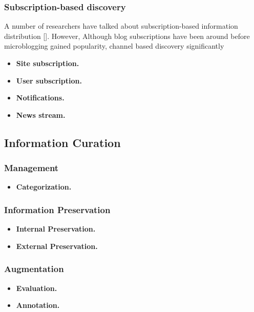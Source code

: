 \documentclass{casconpaper}
\begin{document}
{\subsubsection{Subscription-based discovery}
A number of researchers have talked about subscription-based information distribution []. However,  Although blog subscriptions have been around before microblogging gained popularity, channel based discovery significantly 

\begin{itemize}
  \item \textbf{Site subscription.} 
  \item \textbf{User subscription.}
  \item \textbf{Notifications.}
  \item \textbf{News stream.}
\end{itemize}
} %

{\subsection{Information Curation}
} %

{\subsubsection{Management}
\begin{itemize}
  \item \textbf{Categorization.} 
\end{itemize}
} %

{\subsubsection{Information Preservation}
\begin{itemize}
  \item \textbf{Internal Preservation.} 
  \item \textbf{External Preservation.}
 
\end{itemize}
} %

{\subsubsection{Augmentation}
\begin{itemize}
  \item \textbf{Evaluation.} 
  \item \textbf{Annotation.}
 
\end{itemize}
} %
\end{document}
